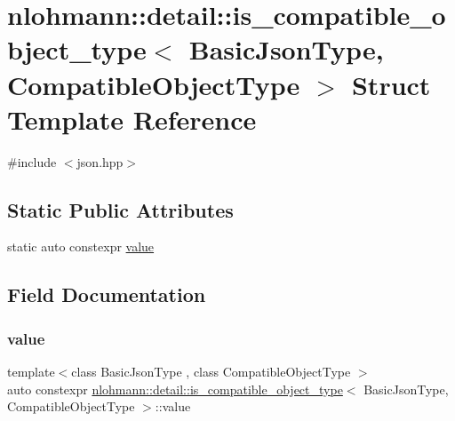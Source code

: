 \hypertarget{structnlohmann_1_1detail_1_1is__compatible__object__type}{}\section{nlohmann\+::detail\+::is\+\_\+compatible\+\_\+object\+\_\+type$<$ Basic\+Json\+Type, Compatible\+Object\+Type $>$ Struct Template Reference}
\label{structnlohmann_1_1detail_1_1is__compatible__object__type}


{\ttfamily \#include $<$json.\+hpp$>$}

\subsection*{Static Public Attributes}
\begin{DoxyCompactItemize}
\item 
static auto constexpr \mbox{\hyperlink{structnlohmann_1_1detail_1_1is__compatible__object__type_a87cce7bcdcd22cc8517f171705f6a7c7}{value}}
\end{DoxyCompactItemize}


\subsection{Field Documentation}
\mbox{\label{structnlohmann_1_1detail_1_1is__compatible__object__type_a87cce7bcdcd22cc8517f171705f6a7c7}} 
\subsubsection{\texorpdfstring{value}{value}}
{\footnotesize\ttfamily template$<$class Basic\+Json\+Type , class Compatible\+Object\+Type $>$ \\
auto constexpr \mbox{\hyperlink{structnlohmann_1_1detail_1_1is__compatible__object__type}{nlohmann\+::detail\+::is\+\_\+compatible\+\_\+object\+\_\+type}}$<$ Basic\+Json\+Type, Compatible\+Object\+Type $>$\+::value\hspace{0.3cm}{\ttfamily [static]}}

